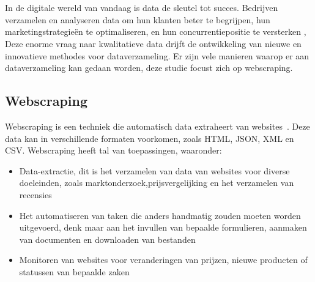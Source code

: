 \chapter{}%
\label{ch:stand-van-zaken}



In de digitale wereld van vandaag is data de sleutel tot succes. Bedrijven verzamelen en analyseren data om hun klanten beter te begrijpen, hun marketingstrategieën te optimaliseren, en hun concurrentiepositie te versterken \autocite{OnesiOzigagun2024},
Deze enorme vraag naar kwalitatieve data drijft de ontwikkeling van nieuwe en innovatieve methodes voor dataverzameling. Er zijn vele manieren waarop er aan dataverzameling kan gedaan worden, deze studie focust zich op webscraping.

\section{Webscraping}
Webscraping is een techniek die automatisch data extraheert van websites~\autocite{Khder2021}. Deze data kan in verschillende formaten voorkomen, zoals HTML, JSON, XML en CSV. Webscraping heeft tal van toepassingen, waaronder:
\begin{itemize}
    \item Data-extractie, dit is het verzamelen van data van websites voor diverse doeleinden,
    zoals marktonderzoek,prijsvergelijking en het verzamelen van recensies
    \item Het automatiseren van taken die anders handmatig zouden moeten worden uitgevoerd, denk maar
    aan het invullen van bepaalde formulieren, aanmaken van documenten en downloaden van bestanden
    \item Monitoren van websites voor veranderingen van prijzen, nieuwe producten of statussen van bepaalde zaken
\end{itemize}


